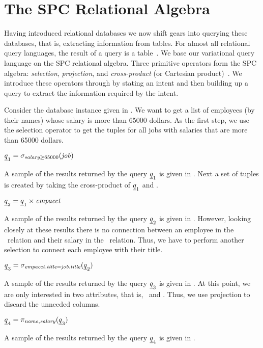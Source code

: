 \section{The SPC Relational Algebra}
\label{sec:ra}

Having introduced relational databases we now shift gears into querying
these databases, that is, extracting information from tables.
For almost all relational query languages, the result of a query 
is a table~\cite{AliceBook}. 
%
We base our variational query language on the SPC relational algebra.
Three primitive operators form the SPC algebra: \emph{selection}, \emph{projection},
and \emph{cross-product} (or Cartesian product)~\cite{AliceBook}.
We introduce these operators through  by stating an intent and then
building up a query to extract the information required by the intent. 

\begin{example}
\label{eg:ra}
Consider the database instance given in . We want to get a list
of employees (by their names) whose salary is more than 65000 dollars. 
As the first step, we use the selection operator to get the tuples for all jobs with salaries that 
are more than 65000 dollars.\\
%
\centerline{
\ensuremath{
{\pQ_1} = \sigma_{\salary \ge 65000} (\job)
}}
%
\noindent
A sample of the results returned by the query ${\pQ_1}$ is given in .
Next a set of 
 tuples is created by taking the cross-product of ${\pQ_1}$
and \empacct.\\
%
\centerline{
\ensuremath{
{\pQ_2} = {\pQ_1} \times \empacct
}}
%
\noindent
A sample of the results returned by the query ${\pQ_2}$ is given in .
However, looking closely at these results there is no connection between an employee
in the \empacct\ relation and their salary in the \job\ relation. Thus, we have to perform 
another selection to connect each employee with their title. \\
%
\centerline{
\ensuremath{
{\pQ_3} = \sigma_{\empacct.\titleatt=\job.\titleatt} ({\pQ_2})
}}
%
\noindent
A sample of the results returned by the query ${\pQ_3}$ is given in .
At this point, we are only interested in two attributes, that is, \name\ and \salary.
Thus, we use projection to discard the unneeded columns.\\
%
\centerline{
\ensuremath{
{\pQ_4} = \pi_{\name, \salary} ({\pQ_3} )
}}
%
A sample of the results returned by the query ${\pQ_4}$ is given in .
\end{example}

